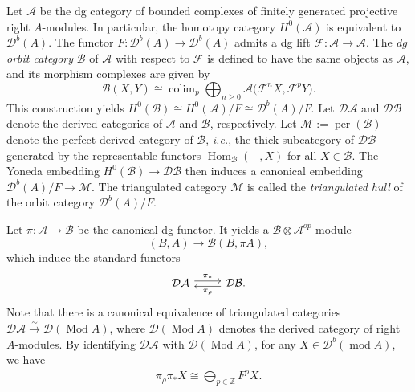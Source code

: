 \documentclass[12pt,reqno]{amsart}
\numberwithin{equation}{section}
\newcommand{\ie}{{\em i.e.}}
\renewcommand{\mod}{\operatorname{mod}\nolimits}
\newcommand{\colim}{\operatorname{colim}\nolimits}
\newcommand{\Hom}{\operatorname{Hom}\nolimits}
\begin{document}
	Let $\mathcal{A}$ be the dg category of bounded complexes of finitely generated
	projective right $A$-modules. In particular, the homotopy category
	$H^0(\mathcal{A})$ is equivalent to $\mathcal{D}^b(A)$. The
	functor
	$F:\mathcal{D}^b(A)\longrightarrow \mathcal{D}^b(A)$
	admits a dg lift
	$\mathcal{F}:\mathcal{A}\longrightarrow \mathcal{A}.$
	The \emph{dg orbit category} $\mathcal{B}$ of $\mathcal{A}$ with respect to
	$\mathcal{F}$ is defined to have the same objects as $\mathcal{A}$, and its
	morphism complexes are given by
	\[
	\mathcal{B}(X,Y)
	\cong
	\colim_{p}\bigoplus_{n\geq 0}
	\mathcal{A}\bigl(\mathcal{F}^nX,\mathcal{F}^pY\bigr).
	\]
	This construction yields
	$H^0(\mathcal{B})\cong H^0(\mathcal{A})/F
	\cong \mathcal{D}^b(A)/F.$ Let $\mathcal{D}\mathcal{A}$ and $\mathcal{D}\mathcal{B}$ denote the derived
	categories of $\mathcal{A}$ and $\mathcal{B}$, respectively. Let
	$\mathcal{M}:=\operatorname{per}(\mathcal{B})$ denote the perfect derived category of $\mathcal{B}$, \ie, the thick subcategory of $\mathcal{DB}$ generated by the representable functors $\Hom_{\mathcal{B}}(-,X)$ for all $X\in \mathcal{B}$. The Yoneda embedding
	$H^0(\mathcal{B})\rightarrow\mathcal{D}\mathcal{B}$
	then induces a canonical embedding
	$\mathcal{D}^b(A)/F \rightarrow \mathcal{M}$. The triangulated category $\mathcal{M}$ is called the {\em triangulated hull} of the orbit category
	$\mathcal{D}^{b}(A)/F$. 
	
	
	Let $\pi:\mathcal{A}\rightarrow \mathcal{B}$ be the canonical dg functor. It yields a $\mathcal{B}\otimes \mathcal{A}^{op}$-module
	\[
	(B, A) \longrightarrow \mathcal{B}(B, \pi A),
	\]
	which induce the standard functors
	\begin{eqnarray}\label{eq:functor-pi-rho}
		\begin{tikzcd}
			{\mathcal{DA}} & {\mathcal{DB}.}
			\arrow["{\pi_*}", shift left, from=1-1, to=1-2]
			\arrow["{\pi_\rho}", shift left, from=1-2, to=1-1]
		\end{tikzcd}
	\end{eqnarray}
	Note that there is a canonical equivalence of triangulated categories $\mathcal{DA}\stackrel{\sim}{\longrightarrow}\mathcal{D}(\operatorname{Mod} A)$, where $\mathcal{D}(\operatorname{Mod} A)$ denotes the derived category of
	right $A$-modules. By identifying $\mathcal{DA}$ with $\mathcal{D}(\operatorname{Mod} A)$, for any $X\in \mathcal{D}^b(\mod A)$, we have
	\begin{align}\label{eq:pi-rho-pi-star-X}
		\pi_\rho\pi_\ast X\cong \bigoplus_{p\in \mathbb{Z}}F^pX.  
	\end{align}
	
\end{document}
